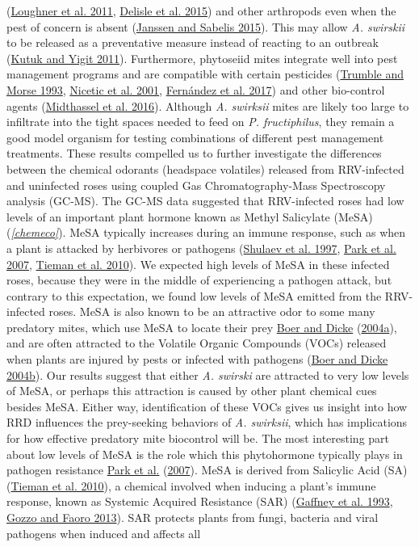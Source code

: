 \documentclass[12pt,final,CPage]{ufthesis}
\begin{document}
{(\protect\hyperlink{ref-Loughner2011}{Loughner et al. 2011}, \protect\hyperlink{ref-Delisle2015}{Delisle et al. 2015}) and other arthropods even when the pest of concern is absent (\protect\hyperlink{ref-Janssen2015}{Janssen and Sabelis 2015}). This may allow \emph{A. swirskii} to be released as a preventative measure instead of reacting to an outbreak (\protect\hyperlink{ref-Kutuk2011}{Kutuk and Yigit 2011}). Furthermore, phytoseiid mites integrate well into pest management programs and are compatible with certain pesticides (\protect\hyperlink{ref-Trumble1993}{Trumble and Morse 1993}, \protect\hyperlink{ref-Nicetic2001}{Nicetic et al. 2001}, \protect\hyperlink{ref-Fernandez2017}{Fernández et al. 2017}) and other bio-control agents (\protect\hyperlink{ref-Midthassel2016}{Midthassel et al. 2016}). Although \emph{A. swirksii} mites are likely too large to infiltrate into the tight spaces needed to feed on \emph{P. fructiphilus}, they remain a good model organism for testing combinations of different pest management treatments. These results compelled us to further investigate the differences between the chemical odorants (headspace volatiles) released from RRV-infected and uninfected roses using coupled Gas Chromatography-Mass Spectroscopy analysis (GC-MS). The GC-MS data suggested that RRV-infected roses had low levels of an important plant hormone known as Methyl Salicylate (MeSA) (\emph{\ref{chemeco}}). MeSA typically increases during an immune response, such as when a plant is attacked by herbivores or pathogens (\protect\hyperlink{ref-Shulaev1997}{Shulaev et al. 1997}, \protect\hyperlink{ref-Park2007}{Park et al. 2007}, \protect\hyperlink{ref-Tieman2010}{Tieman et al. 2010}). We expected high levels of MeSA in these infected roses, because they were in the middle of experiencing a pathogen attack, but contrary to this expectation, we found low levels of MeSA emitted from the RRV-infected roses. MeSA is also known to be an attractive odor to some many predatory mites, which use MeSA to locate their prey \protect\hyperlink{ref-Boer2004a}{Boer and Dicke} (\protect\hyperlink{ref-Boer2004a}{2004a}), and are often attracted to the Volatile Organic Compounds (VOCs) released when plants are injured by pests or infected with pathogens (\protect\hyperlink{ref-Boer2004b}{Boer and Dicke 2004b}). Our results suggest that either \emph{A. swirski} are attracted to very low levels of MeSA, or perhaps this attraction is caused by other plant chemical cues besides MeSA. Either way, identification of these VOCs gives us insight into how RRD influences the prey-seeking behaviors of \emph{A. swirksii}, which has implications for how effective predatory mite biocontrol will be. The most interesting part about low levels of MeSA is the role which this phytohormone typically plays in pathogen resistance \protect\hyperlink{ref-Park2007}{Park et al.} (\protect\hyperlink{ref-Park2007}{2007}). MeSA is derived from Salicylic Acid (SA) (\protect\hyperlink{ref-Tieman2010}{Tieman et al. 2010}), a chemical involved when inducing a plant's immune response, known as Systemic Acquired Resistance (SAR) (\protect\hyperlink{ref-Gaffney1993}{Gaffney et al. 1993}, \protect\hyperlink{ref-Gozzo2013}{Gozzo and Faoro 2013}). SAR protects plants from fungi, bacteria and viral pathogens when induced and affects all }
\end{document}
